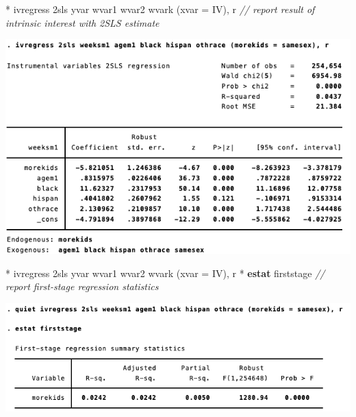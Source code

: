 \documentclass[
  10pt,
  ignorenonframetext,
]{beamer}
\newenvironment{Shaded}{\begin{snugshade}}{\end{snugshade}}
\newcommand{\CommentTok}[1]{\textcolor[rgb]{0.56,0.35,0.01}{\textit{#1}}}
\newcommand{\FunctionTok}[1]{\textcolor[rgb]{0.00,0.00,0.00}{#1}}
\newcommand{\KeywordTok}[1]{\textcolor[rgb]{0.13,0.29,0.53}{\textbf{#1}}}
\newcommand{\NormalTok}[1]{#1}
\begin{document}
\begin{frame}[fragile]{}
\protect\hypertarget{section-3}{}
\small

\begin{Shaded}
\begin{Highlighting}[]
\NormalTok{* ivregress 2sls yvar wvar1 wvar2 wvark (xvar = IV), }\FunctionTok{r}
\CommentTok{// report result of intrinsic interest with 2SLS estimate}
\end{Highlighting}
\end{Shaded}

\begin{center}\includegraphics[width=1\linewidth]{pictures/res6-ivregress2SLS} \end{center}
\end{frame}

\begin{frame}[fragile]{}
\protect\hypertarget{section-4}{}
\small

\begin{Shaded}
\begin{Highlighting}[]
\NormalTok{* ivregress 2sls yvar wvar1 wvar2 wvark (xvar = IV), }\FunctionTok{r}
\NormalTok{* }\KeywordTok{estat}\NormalTok{ firststage}
\CommentTok{// report first{-}stage regression statistics}
\end{Highlighting}
\end{Shaded}

\begin{center}\includegraphics[width=1\linewidth]{pictures/res7-estatFirstStage2SLS} \end{center}
\end{frame}
\end{document}
